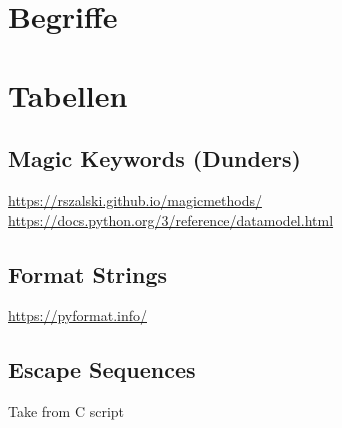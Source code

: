 \appendix
\begin{appendices}
\chapter{Begriffe}

\chapter{Tabellen}
\section{Magic Keywords (Dunders)}
\url{https://rszalski.github.io/magicmethods/}
\url{https://docs.python.org/3/reference/datamodel.html}

\section{Format Strings}
\label{sec:FormatStringsTable}
\url{https://pyformat.info/}

\section{Escape Sequences}
Take from C script

\end{appendices}
